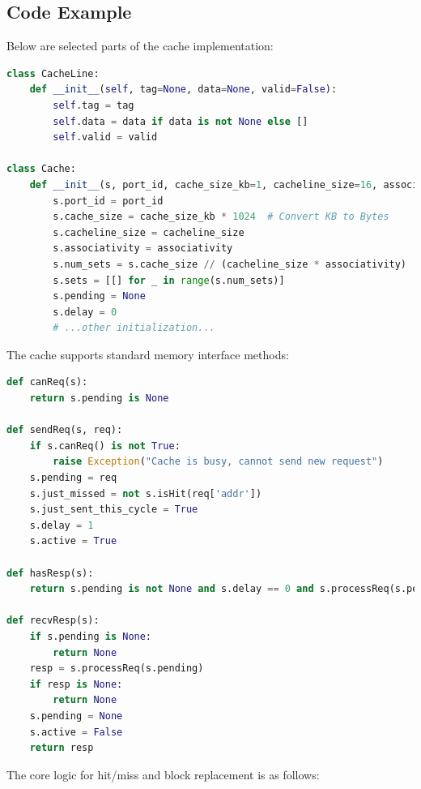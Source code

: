 \documentclass[12pt,a4paper]{report}
\begin{document}
\subsection{Code Example}
Below are selected parts of the cache implementation:

\begin{lstlisting}[language=Python]
class CacheLine:
    def __init__(self, tag=None, data=None, valid=False):
        self.tag = tag
        self.data = data if data is not None else []
        self.valid = valid

class Cache:
    def __init__(s, port_id, cache_size_kb=1, cacheline_size=16, associativity=1):
        s.port_id = port_id
        s.cache_size = cache_size_kb * 1024  # Convert KB to Bytes
        s.cacheline_size = cacheline_size
        s.associativity = associativity
        s.num_sets = s.cache_size // (cacheline_size * associativity)
        s.sets = [[] for _ in range(s.num_sets)]
        s.pending = None
        s.delay = 0
        # ...other initialization...
\end{lstlisting}

The cache supports standard memory interface methods:

\begin{lstlisting}[language=Python]
def canReq(s):
    return s.pending is None

def sendReq(s, req):
    if s.canReq() is not True:
        raise Exception("Cache is busy, cannot send new request")
    s.pending = req
    s.just_missed = not s.isHit(req['addr'])
    s.just_sent_this_cycle = True
    s.delay = 1
    s.active = True

def hasResp(s):
    return s.pending is not None and s.delay == 0 and s.processReq(s.pending) is not None

def recvResp(s):
    if s.pending is None:
        return None
    resp = s.processReq(s.pending)
    if resp is None:
        return None
    s.pending = None
    s.active = False
    return resp
\end{lstlisting}

The core logic for hit/miss and block replacement is as follows:
\end{document}
